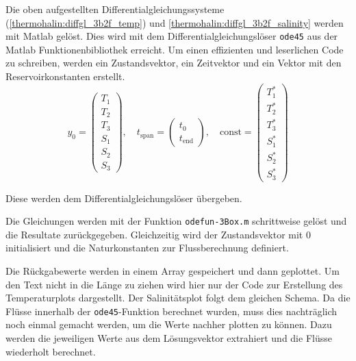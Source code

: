 Die oben aufgestellten Differentialgleichungssysteme (\ref{thermohalin:diffgl_3b2f_temp}) und \ref{thermohalin:diffgl_3b2f_salinity} werden mit Matlab gelöst. Dies wird mit dem Differentialgleichungslöser \texttt{ode45} aus der Matlab Funktionenbibliothek erreicht.
Um einen effizienten und leserlichen Code zu schreiben, werden ein Zustandsvektor, ein Zeitvektor und ein Vektor mit den Reservoirkonstanten erstellt.
\begin{equation*}
y_0 = \begin{pmatrix}T_{1} \\ T_{2} \\ T_{3} \\ S_{1} \\ S_{2} \\ S_{3}\end{pmatrix}, \quad
t_{\text{span}} = \begin{pmatrix}t_0 \\ t_{\text{end}} \end{pmatrix}, \quad
\text{const} = \begin{pmatrix}T_{1}^{*} \\ T_{2}^{*} \\ T_{3}^{*} \\ S_{1}^{*} \\ S_{2}^{*} \\ S_{3}^{*}\end{pmatrix}
\end{equation*}




\label{thermohalin:listing:input}
Diese werden dem Differentialgleichungslöser übergeben.
\label{thermohalin:listing:uebergabe}

Die Gleichungen werden mit der Funktion \texttt{odefun-3Box.m} schrittweise gelöst und die Resultate zurückgegeben. Gleichzeitig wird der Zustandsvektor mit $0$ initialisiert und die Naturkonstanten zur Flussberechnung definiert.

\label{thermohalin:listing:solve}

Die Rückgabewerte werden in einem Array gespeichert und dann geplottet. Um den Text nicht in die Länge zu ziehen wird hier nur der Code zur Erstellung des Temperaturplots dargestellt. Der Salinitätsplot folgt dem gleichen Schema.
Da die Flüsse innerhalb der \texttt{ode45}-Funktion berechnet wurden, muss dies nachträglich noch einmal gemacht werden, um die Werte nachher plotten zu können. Dazu werden die jeweiligen Werte aus dem Lösungsvektor extrahiert und die Flüsse wiederholt berechnet.
\label{thermohalin:listing:plot}

